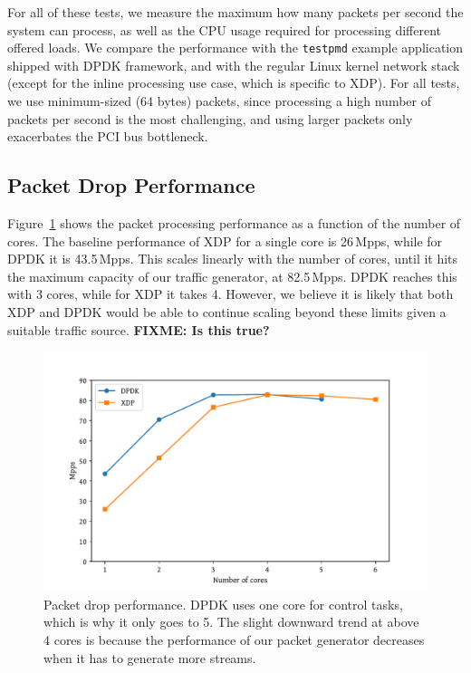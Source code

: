 \documentclass[10pt,sigconf]{acmart}
\begin{document}
For all of these tests, we measure the maximum how many packets per second the
system can process, as well as the CPU usage required for processing different
offered loads. We compare the performance with the \texttt{testpmd} example
application shipped with DPDK framework, and with the regular Linux kernel
network stack (except for the inline processing use case, which is specific to
XDP). For all tests, we use minimum-sized (64 bytes) packets, since processing a
high number of packets per second is the most challenging, and using larger
packets only exacerbates the PCI bus bottleneck.

\subsection{Packet Drop Performance}
\label{sec:basel-pack-proc}
Figure~\ref{fig:drop-test} shows the packet processing performance as a function
of the number of cores. The baseline performance of XDP for a single core is
26\,Mpps, while for DPDK it is 43.5\,Mpps. This scales linearly with the number
of cores, until it hits the maximum capacity of our traffic generator, at
82.5\,Mpps. DPDK reaches this with 3 cores, while for XDP it takes 4. However,
we believe it is likely that both XDP and DPDK would be able to continue scaling
beyond these limits given a suitable traffic source. \textbf{FIXME: Is this
  true?}

\begin{figure}[t]
\centering
\includegraphics[width=\linewidth]{figures/drop-test.pdf}
\caption{\label{fig:drop-test} Packet drop performance. DPDK uses one core for
  control tasks, which is why it only goes to 5. The slight downward trend at
  above 4 cores is because the performance of our packet generator decreases
  when it has to generate more streams.}
\end{figure}
\end{document}
